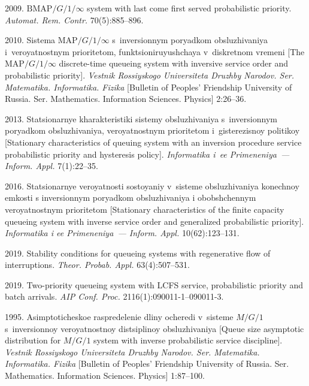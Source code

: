 \begin{multicols}{2}
{{\begin{thebibliography}{99}
 2009. ${\mathrm{BMAP}/G/1/\infty}$ system with last
come first served probabilistic priority. \textit{Automat. Rem.
\mbox{Contr.}} 70(5):885--896.



 2010. Sistema
$\mathrm{MAP}/G/1/\infty$ s~inversionnym poryadkom obsluzhivaniya 
i~veroyatnostnym prioritetom, funktsioniruyushchaya v~diskretnom vremeni 
[The $\mathrm{MAP}/G/1/\infty$ discrete-time
queueing system with inversive service order and probabilistic priority]. 
\textit{Vestnik Rossiyskogo Universiteta Druzhby Narodov. Ser.
 Matematika. Informatika. Fizika} [Bulletin of
Peoples' Friendship University of Russia. Ser. Mathematics. 
Information Sciences. Physics] 2:26--36.

 2013. Sta\-tsi\-o\-nar\-nye 
kharakteristiki sistemy obsluzhivaniya s~inversionnym poryadkom obsluzhivaniya, 
veroyatnostnym pri\-o\-ri\-te\-tom i~gisterezisnoy politikoy [Stationary characteristics
of queuing system with an inversion procedure service
probabilistic priority and hysteresis policy]. \textit{Informatika
i~ee Primeneniya~--- Inform. Appl.} 7(1):22--35.

 2016. Statsionarnye ve\-ro\-yat\-nosti sostoyaniy v~sisteme obsluzhivaniya konechnoy emkosti s inversionnym poryadkom obsluzhivaniya i obobshchennym veroyatnostnym prioritetom
[Stationary characteristics of the finite capacity queueing 
system with inverse service order and generalized probabilistic priority].
\textit{Informatika i ee Primeneniya~--- Inform. Appl.} 10(62):123--131.

 2019. 
Stability conditions for queueing systems with regenerative flow of interruptions. 
\textit{Theor. Probab. Appl.} 63(4):507--531.

 2019. Two-priority queueing system with LCFS service, 
probabilistic priority and batch arrivals. \textit{AIP Conf. Proc.} 
2116(1):090011-1--090011-3.


 1995.
Asimptoticheskoe raspredelenie dliny ocheredi v~sisteme $M/G/1$ 
s~in\-ver\-si\-on\-noy ve\-ro\-yat\-nost\-noy distsiplinoy obsluzhivaniya
[Queue size asymptotic distribution for $M/G/1$ system with inverse probabilistic service discipline].
\textit{Vestnik Rossiyskogo Universiteta Druzhby Narodov. Ser. Matematika. 
Informatika. Fizika} [Bulletin of
Peoples' Friendship University of Russia. Ser. Mathematics. Information Sciences.
 Physics] 1:87--100.


\end{thebibliography}}}
\end{multicols}
